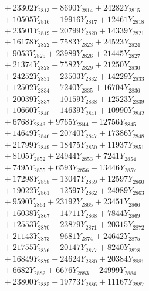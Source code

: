 \documentclass[a4paper,10pt]{article}
\begin{document}
{\begin{align}
&\;  + 23302 Y_{2813} + 8690 Y_{2814} + 24282 Y_{2815} \\[0.3ex]
&\;  + 10505 Y_{2816} + 19916 Y_{2817} + 12461 Y_{2818} \\[0.5ex]\allowbreak
&\;  + 23501 Y_{2819} + 20799 Y_{2820} + 14339 Y_{2821} \\[0.3ex]
&\;  + 16178 Y_{2822} + 7583 Y_{2823} + 24523 Y_{2824} \\[0.3ex]
&\;  + 9053 Y_{2825} + 23989 Y_{2826} + 21445 Y_{2827} \\[0.3ex]
&\;  + 21374 Y_{2828} + 7582 Y_{2829} + 21250 Y_{2830} \\[0.3ex]
&\;  + 24252 Y_{2831} + 23503 Y_{2832} + 14229 Y_{2833} \\[0.3ex]
&\;  + 12502 Y_{2834} + 7240 Y_{2835} + 16704 Y_{2836} \\[0.3ex]
&\;  + 20039 Y_{2837} + 10159 Y_{2838} + 12523 Y_{2839} \\[0.3ex]
&\;  + 10660 Y_{2840} + 14639 Y_{2841} + 10990 Y_{2842} \\[0.3ex]
&\;  + 6768 Y_{2843} + 9765 Y_{2844} + 12756 Y_{2845} \\[0.3ex]
&\;  + 14649 Y_{2846} + 20740 Y_{2847} + 17386 Y_{2848} \\[0.5ex]\allowbreak
&\;  + 21799 Y_{2849} + 18475 Y_{2850} + 11937 Y_{2851} \\[0.3ex]
&\;  + 8105 Y_{2852} + 24944 Y_{2853} + 7241 Y_{2854} \\[0.3ex]
&\;  + 7495 Y_{2855} + 6593 Y_{2856} + 13446 Y_{2857} \\[0.3ex]
&\;  + 17298 Y_{2858} + 13047 Y_{2859} + 12597 Y_{2860} \\[0.3ex]
&\;  + 19022 Y_{2861} + 12597 Y_{2862} + 24989 Y_{2863} \\[0.3ex]
&\;  + 9590 Y_{2864} + 23192 Y_{2865} + 23451 Y_{2866} \\[0.3ex]
&\;  + 16038 Y_{2867} + 14711 Y_{2868} + 7844 Y_{2869} \\[0.3ex]
&\;  + 12553 Y_{2870} + 23879 Y_{2871} + 20315 Y_{2872} \\[0.3ex]
&\;  + 21143 Y_{2873} + 9681 Y_{2874} + 24642 Y_{2875} \\[0.3ex]
&\;  + 21755 Y_{2876} + 20147 Y_{2877} + 8240 Y_{2878} \\[0.5ex]\allowbreak
&\;  + 16849 Y_{2879} + 24624 Y_{2880} + 20384 Y_{2881} \\[0.3ex]
&\;  + 6682 Y_{2882} + 6676 Y_{2883} + 24999 Y_{2884} \\[0.3ex]
&\;  + 23800 Y_{2885} + 19773 Y_{2886} + 11167 Y_{2887} \\[0.3ex]

\end{align}}
\end{document}
